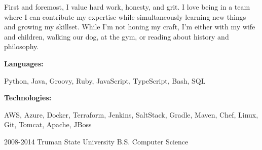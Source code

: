 \documentclass[9pt]{developercv} %
\begin{document}
\begin{minipage}[t]{0.46\textwidth}
    \vspace{-6pt} 
\par  First and foremost, I value hard work, honesty, and grit. I love being in a team where I can contribute my expertise
while simultaneously learning new things and growing my skillset. While I’m not honing my craft, I’m either with my
wife and children, walking our dog, at the gym, or reading about history and philosophy.
\end{minipage}
\hfill %
\begin{minipage}[t]{0.465\textwidth}
    \vspace{-6pt}
    
    \begin{minipage}[t]{0.2\textwidth}
        \textbf{Languages:}
    \end{minipage}
    \hfill
    \begin{minipage}[t]{0.73\textwidth}
      Python, Java, Groovy, Ruby, JavaScript, TypeScript, Bash, SQL  
    \end{minipage}
    \vspace{4mm}
    
    \begin{minipage}[t]{0.2\textwidth}
        \textbf{Technologies:}
    \end{minipage}
    \hfill
    \begin{minipage}[t]{0.73\textwidth}
      AWS, Azure, Docker, Terraform, Jenkins, SaltStack, Gradle, Maven, Chef, Linux, Git, Tomcat, Apache, JBoss
    \end{minipage} 
\end{minipage}

\vspace{-10 pt}
\begin{entrylist}
    \entry
		{2008-2014}
		{Truman State University}
		{}
		{B.S. Computer Science}
\end{entrylist}
\end{document}
